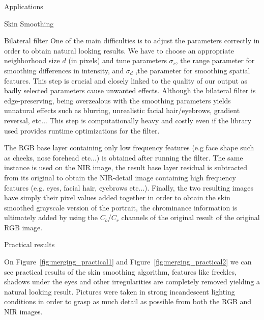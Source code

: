 \documentclass[10pt]{article}
\begin{document}
\begin{section}{Applications}
\begin{subsection}{Skin Smoothing}
\begin{subsubsection}{Bilateral filter}
            One of the main difficulties is to adjust the parameters correctly in order to obtain natural looking results. We have to choose an appropriate neighborhood size $d$ (in pixels) and tune parameters $\sigma_r$, the range parameter for smoothing differences in intensity, and $\sigma_d$ ,the parameter for smoothing spatial features. This step is crucial and closely linked to the quality of our output as badly selected parameters cause unwanted effects. Although the bilateral filter is edge-preserving, being overzealous with the smoothing parameters yields unnatural effects such as blurring, unrealistic facial hair/eyebrows, gradient reversal, etc... This step is computationally heavy and costly even if the library used provides runtime optimizations for the filter.

            \medskip

            The RGB base layer containing only low frequency features (e.g face shape such as cheeks, nose forehead etc...) is obtained after running the filter. The same instance is used on the NIR image, the result base layer residual is subtracted from its original to obtain the NIR-detail image containing high frequency features (e.g. eyes, facial hair, eyebrows etc...). Finally, the two resulting images have simply their pixel values added together in order to obtain the skin smoothed grayscale version of the portrait, the chrominance information is ultimately added by using the $C_b$/$C_r$ channels of the original result of the original RGB image.

        \end{subsubsection}

        \begin{subsubsection}{Practical results}

            On Figure~\ref{fig:merging_practical1} and Figure~\ref{fig:merging_practical2}  we can see practical results of the skin smoothing algorithm, features like freckles, shadows under the eyes and other irregularities are completely removed yielding a natural looking result. Pictures were taken in strong incandescent lighting conditions in order to grasp as much detail as possible from both the RGB and NIR images.


\end{subsubsection}
\end{subsection}
\end{section}
\end{document}
